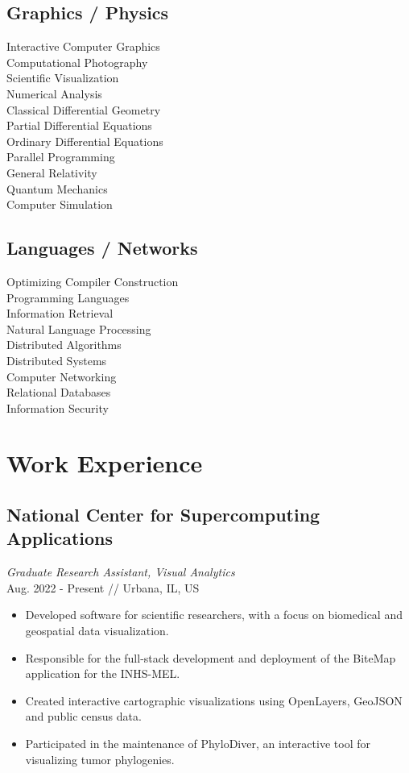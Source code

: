 \documentclass[11pt,twocolumn]{article}
\begin{document}
\subsection*{{Graphics / Physics}}
Interactive Computer Graphics\\
Computational Photography\\
Scientific Visualization\\
Numerical Analysis\\
Classical Differential Geometry\\
Partial Differential Equations\\
Ordinary Differential Equations\\
Parallel Programming\\
General Relativity\\
Quantum Mechanics\\
Computer Simulation

\subsection*{{Languages / Networks}}
Optimizing Compiler Construction\\
Programming Languages\\
Information Retrieval\\
Natural Language Processing\\
Distributed Algorithms\\
Distributed Systems\\
Computer Networking\\
Relational Databases\\
Information Security\\

\newpage

\section*{\textsf{Work Experience}}

\subsection*{National Center for Supercomputing Applications}
\textit{Graduate Research Assistant, Visual Analytics} \\
Aug. 2022 - Present // Urbana, IL, US

\begin{itemize}
\item Developed software for scientific researchers, with a focus on biomedical and geospatial data visualization.
\item Responsible for the full-stack development and deployment of the BiteMap application for the INHS-MEL.
\item Created interactive cartographic visualizations using OpenLayers, GeoJSON and public census data.
\item Participated in the maintenance of PhyloDiver, an interactive tool for visualizing tumor phylogenies.
\end{itemize}
\end{document}
